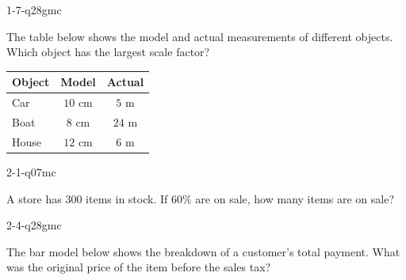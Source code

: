 \begin{practiceQuestion}{1-7-q28}{gmc}
\begin{questionText}
The table below shows the model and actual measurements of different objects. Which object has the largest scale factor?

\begin{center}
\begin{tabular}{|l|c|c|}
\hline
\textbf{Object} & \textbf{Model} & \textbf{Actual} \\
\hline
Car & $10$ cm & $5$ m \\
\hline
Boat & $8$ cm & $24$ m \\
\hline
House & $12$ cm & $6$ m \\
\hline
\end{tabular}
\end{center}
\end{questionText}
\end{practiceQuestion}

\begin{practiceQuestion}{2-1-q07}{mc}
\begin{questionText}
A store has $300$ items in stock. If $60\%$ are on sale, how many items are on sale?
\end{questionText}
\end{practiceQuestion}

\begin{practiceQuestion}{2-4-q28}{gmc}
\begin{questionText}
The bar model below shows the breakdown of a customer's total payment. What was the original price of the item before the sales tax?

\begin{center}
\end{center}
\end{questionText}
\end{practiceQuestion}

